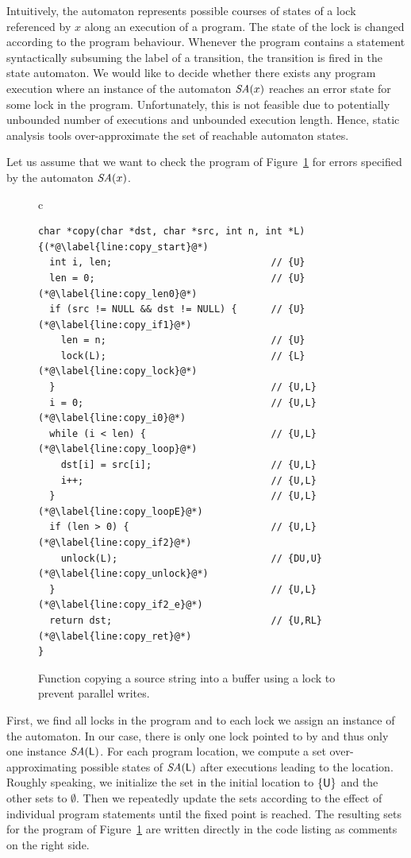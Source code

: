 Intuitively, the automaton represents possible courses of states of a lock
referenced by $x$ along an execution of a program.  The state of the lock is
changed according to the program behaviour.  Whenever the program contains a
statement syntactically subsuming the label of a transition, the transition is
fired in the state automaton. We would like to decide whether there exists any
program execution where an instance of the automaton ${\textit{SA}}(x)$ reaches an error
state for some lock in the program.  Unfortunately, this is not feasible due
to potentially unbounded number of executions and unbounded execution length.
Hence, static analysis tools over-approximate the set of reachable automaton
states.

Let us assume that we want to check the program of Figure~\ref{fig:copy} for
errors specified by the automaton ${\textit{SA}}(x)$.
\begin{figure}[htb]
  \begin{center}
  \begin{tabular}{c}
    \begin{lstlisting}
char *copy(char *dst, char *src, int n, int *L) {(*@\label{line:copy_start}@*)
  int i, len;                            // {U}
  len = 0;                               // {U}(*@\label{line:copy_len0}@*)
  if (src != NULL && dst != NULL) {      // {U}(*@\label{line:copy_if1}@*)
    len = n;                             // {U}
    lock(L);                             // {L}(*@\label{line:copy_lock}@*)
  }                                      // {U,L}
  i = 0;                                 // {U,L}(*@\label{line:copy_i0}@*)
  while (i < len) {                      // {U,L}(*@\label{line:copy_loop}@*)
    dst[i] = src[i];                     // {U,L}
    i++;                                 // {U,L}
  }                                      // {U,L}(*@\label{line:copy_loopE}@*)
  if (len > 0) {                         // {U,L}(*@\label{line:copy_if2}@*)
    unlock(L);                           // {DU,U}(*@\label{line:copy_unlock}@*)
  }                                      // {U,L}(*@\label{line:copy_if2_e}@*)
  return dst;                            // {U,RL}(*@\label{line:copy_ret}@*)
}
    \end{lstlisting}
  \end{tabular}
  \end{center}
    \caption{Function  copying a source string 
      into a buffer  using a lock  to prevent parallel
      writes.}
    \label{fig:copy}
\end{figure}
First, we find all locks in the program and to each lock we assign an instance
of the automaton. In our case, there is only one lock pointed to by 
and thus only one instance ${\textit{SA}}(\mathsf{L})$. For each program location, we
compute a set over-approximating possible states of ${\textit{SA}}(\mathsf{L})$ after
executions leading to the location. Roughly speaking, we initialize the set in
the initial location to $\{\mathsf{U}\}$ and the other sets to $\emptyset$. Then
we repeatedly update the sets according to the effect of individual program
statements until the fixed point is reached.  The resulting sets for the
program of Figure~\ref{fig:copy} are written directly in the code listing as
comments on the right side.

